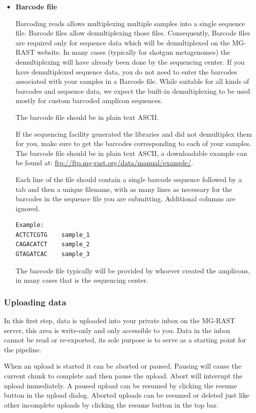 \documentclass[12pt,fullpage]{report}
\begin{document}
\begin{itemize}
\item {\bf Barcode file}

Barcoding reads allows multiplexing multiple samples into a single sequence file. Barcode files allow demultiplexing those files. Consequently, Barcode files are required only for sequence data which will be demultiplexed on the MG-RAST website. In many cases (typically for shotgun metagenomes) the demultiplexing will have already been done by the sequencing center. If you have demultiplexed sequence data, you do not need to enter the barcodes associated with your samples in a Barcode file. While suitable for all kinds of barcodes and sequence data, we expect the built-in demultiplexing to be used mostly for custom barcoded amplicon sequences.

The barcode file should be in plain text ASCII.

If the sequencing facility generated the libraries and did not demultiplex them for you, make sure to get the barcodes corresponding to each of your samples. The barcode file should be in plain text ASCII, a downloadable example can be found at: \url{ftp://ftp.mg-rast.org/data/manual/example/}.

Each line of the file should contain a single barcode sequence followed by a tab and then a unique filename, with as many lines as necessary for the barcodes in the sequence file you are submitting.  Additional columns are ignored.
\begin{verbatim}
Example:
ACTCTCGTG    sample_1
CAGACATCT    sample_2
GTAGATCAC    sample_3
\end{verbatim}

The barcode file typically will be provided by whoever created the amplicons, in many cases that is the sequencing center.
\end{itemize} %


\subsubsection*{Uploading data}
In this first step, data is uploaded into your private inbox on the MG-RAST server, this area is write-only and only accessible to you. Data in the inbox cannot be read or re-exported, its sole purpose is to serve as a starting point for the pipeline.

When an upload is started it can be aborted or paused. Pausing will cause the current chunk to complete and then pause the upload. Abort will interrupt the upload immediately. A paused upload can be resumed by clicking the resume button in the upload dialog. Aborted uploads can be resumed or deleted just like other incomplete uploads by clicking the resume button in the top bar.
\end{document}
